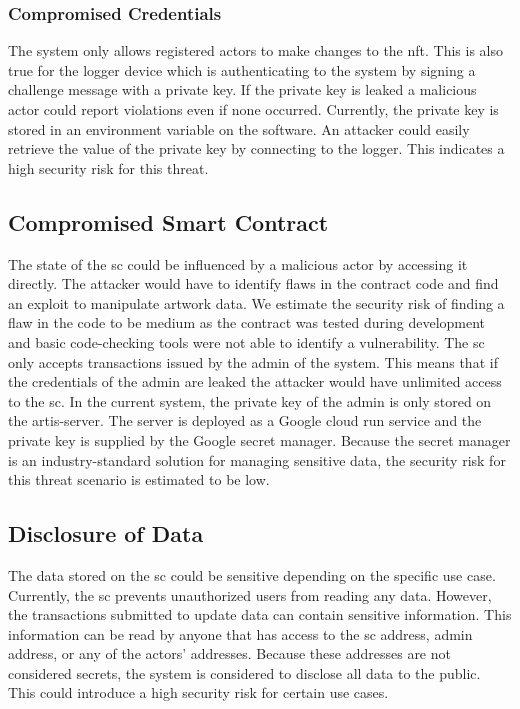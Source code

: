 \subsubsection{Compromised Credentials}
The system only allows registered actors to make changes to the \gls{nft}. This is also true for the logger device which is authenticating to the system by signing a challenge message with a private key. If the private key is leaked a malicious actor could report violations even if none occurred. Currently, the private key is stored in an environment variable on the software. An attacker could easily retrieve the value of the private key by connecting to the logger. This indicates a high security risk for this threat.

\subsection{Compromised Smart Contract}
The state of the \gls{sc} could be influenced by a malicious actor by accessing it directly. The attacker would have to identify flaws in the contract code and find an exploit to manipulate artwork data. We estimate the security risk of finding a flaw in the code to be medium as the contract was tested during development and basic code-checking tools were not able to identify a vulnerability. The \gls{sc} only accepts transactions issued by the admin of the system. This means that if the credentials of the admin are leaked the attacker would have unlimited access to the \gls{sc}. In the current system, the private key of the admin is only stored on the artis-server. The server is deployed as a Google cloud run service and the private key is supplied by the Google secret manager. Because the secret manager is an industry-standard solution for managing sensitive data, the security risk for this threat scenario is estimated to be low.

\subsection{Disclosure of Data}
The data stored on the \gls{sc} could be sensitive depending on the specific use case. Currently, the \gls{sc} prevents unauthorized users from reading any data. However, the transactions submitted to update data can contain sensitive information. This information can be read by anyone that has access to the \gls{sc} address, admin address, or any of the actors' addresses. Because these addresses are not considered secrets, the system is considered to disclose all data to the public. This could introduce a high security risk for certain use cases.

